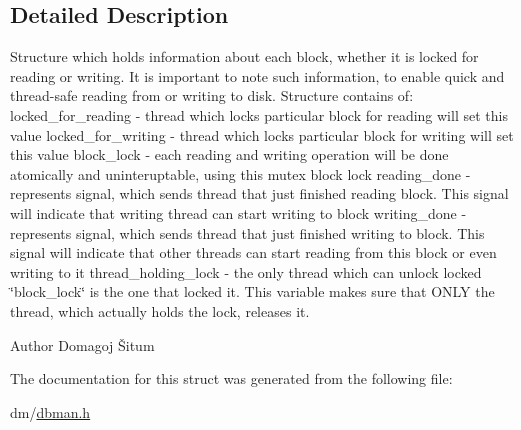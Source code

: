 \subsection{Detailed Description}
Structure which holds information about each block, whether it is locked for reading or writing. It is important to note such information, to enable quick and thread-\/safe reading from or writing to disk. Structure contains of\+: locked\+\_\+for\+\_\+reading -\/ thread which locks particular block for reading will set this value locked\+\_\+for\+\_\+writing -\/ thread which locks particular block for writing will set this value block\+\_\+lock -\/ each reading and writing operation will be done atomically and uninteruptable, using this mutex block lock reading\+\_\+done -\/ represents signal, which sends thread that just finished reading block. This signal will indicate that writing thread can start writing to block writing\+\_\+done -\/ represents signal, which sends thread that just finished writing to block. This signal will indicate that other threads can start reading from this block or even writing to it thread\+\_\+holding\+\_\+lock -\/ the only thread which can unlock locked \char`\"{}block\+\_\+lock\char`\"{} is the one that locked it. This variable makes sure that O\+N\+LY the thread, which actually holds the lock, releases it. 

\begin{DoxyAuthor}{Author}
Domagoj Šitum 
\end{DoxyAuthor}


The documentation for this struct was generated from the following file\+:\begin{DoxyCompactItemize}
\item 
dm/\hyperlink{dbman_8h}{dbman.\+h}\end{DoxyCompactItemize}
